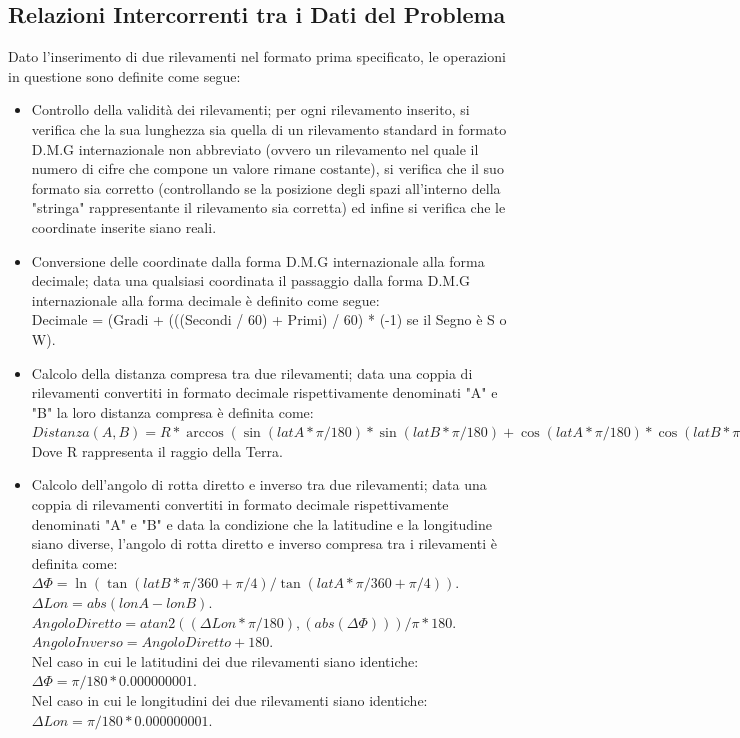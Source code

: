 \documentclass{article}
\begin{document}
\subsection{Relazioni Intercorrenti tra i Dati del Problema}
Dato l'inserimento di due rilevamenti nel formato prima specificato, le operazioni in questione sono definite come segue:
\begin{itemize}
	\item Controllo della validità dei rilevamenti; per ogni rilevamento inserito, si verifica che la sua lunghezza sia quella di un rilevamento standard in formato D.M.G internazionale non abbreviato (ovvero un rilevamento nel quale il numero di cifre che compone un valore rimane costante), si verifica che il suo formato sia corretto (controllando se la posizione degli spazi all'interno della "stringa" rappresentante il rilevamento sia corretta) ed infine si verifica che le coordinate inserite siano reali. 
	
	\item Conversione delle coordinate dalla forma D.M.G internazionale alla forma decimale; data una qualsiasi coordinata il passaggio dalla forma D.M.G internazionale alla forma decimale è definito come segue: \\
	Decimale = (Gradi + (((Secondi / 60) + Primi) / 60) * (-1) se il Segno è  S o W).
	
	\item Calcolo della distanza compresa tra due rilevamenti;  data una coppia di rilevamenti convertiti in formato decimale rispettivamente denominati "A" e "B" la loro distanza compresa è definita come: \\
	$Distanza(A, B) = R * \arccos(\sin(latA * \pi / 180) * \sin(latB * \pi / 180) + \cos(latA * \pi / 180) * \cos(latB * \pi / 180) * \cos((lonA - lonB) * \pi / 180)). $\\
	Dove R rappresenta il raggio della Terra.
	
	\item Calcolo dell'angolo di rotta diretto e inverso tra due rilevamenti; data una coppia di rilevamenti convertiti in formato decimale rispettivamente denominati "A" e "B" e data la condizione che la latitudine e la longitudine siano diverse, l'angolo di rotta diretto e inverso compresa tra i rilevamenti è definita come: \\
	$\Delta\Phi = \ln( \tan(latB * \pi / 360 + \pi / 4 ) / \tan(latA * \pi / 360 + \pi / 4 )). $\\
	$ \Delta Lon = abs(lonA - lonB). $ \\
	$ Angolo Diretto = atan2((\Delta Lon * \pi / 180), (abs(\Delta\Phi))) / \pi * 180. $\\
	$ Angolo Inverso = Angolo Diretto + 180.$\\
	Nel caso in cui le latitudini dei due rilevamenti siano identiche:\\
	$\Delta\Phi = \pi / 180 * 0.000000001.$\\
	Nel caso in cui le longitudini dei due rilevamenti siano identiche:\\
	$\Delta Lon = \pi / 180 * 0.000000001.$\\
\end{itemize}
\newpage
\end{document}
